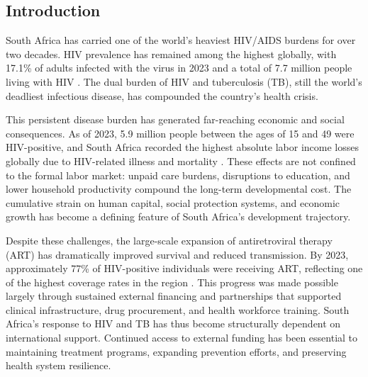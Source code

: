 \documentclass[letterpaper,12pt]{article}
\theoremstyle{definition}
\begin{document}
\begin{spacing}{1.5}


\newpage

\section{Introduction}\label{SecIntro}

South Africa has carried one of the world's heaviest HIV/AIDS burdens for over two decades. HIV prevalence has remained among the highest globally, with 17.1\% of adults infected with the virus in 2023 and a total of 7.7 million people living with HIV \citep{UNAIDSData2024}. The dual burden of HIV and tuberculosis (TB), still the world's deadliest infectious disease, has compounded the country's health crisis.

This persistent disease burden has generated far-reaching economic and social consequences. As of 2023, 5.9 million people between the ages of 15 and 49 were HIV-positive, and South Africa recorded the highest absolute labor income losses globally due to HIV-related illness and mortality \citep{ILO2018}. These effects are not confined to the formal labor market: unpaid care burdens, disruptions to education, and lower household productivity compound the long-term developmental cost. The cumulative strain on human capital, social protection systems, and economic growth has become a defining feature of South Africa's development trajectory.

Despite these challenges, the large-scale expansion of antiretroviral therapy (ART) has dramatically improved survival and reduced transmission. By 2023, approximately 77\% of HIV-positive individuals were receiving ART, reflecting one of the highest coverage rates in the region \citep{UNAIDSData2024}. This progress was made possible largely through sustained external financing and partnerships that supported clinical infrastructure, drug procurement, and health workforce training. South Africa's response to HIV and TB has thus become structurally dependent on international support. Continued access to external funding has been essential to maintaining treatment programs, expanding prevention efforts, and preserving health system resilience.


\end{spacing}
\end{document}
